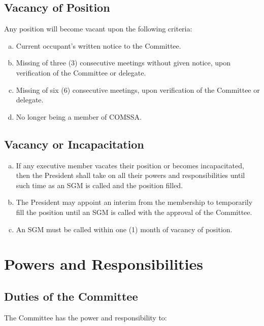 \documentclass[a4paper,12pt]{article}
\begin{document}
\subsection{Vacancy of Position}

Any position will become vacant upon the following criteria:

\begin{enumerate}[a)]
	\item Current occupant's written notice to the Committee.
	\item Missing of three (3) consecutive meetings without given notice, upon verification of the Committee or delegate.
	\item Missing of six (6) consecutive meetings, upon verification of the Committee or delegate.
	\item No longer being a member of COMSSA.
\end{enumerate}

\subsection{Vacancy or Incapacitation}

\begin{enumerate}[a)]
	\item If any executive member vacates their position or becomes incapacitated, then the President shall take on all their powers and responsibilities until such time as an SGM is called and the position filled.
	\item The President may appoint an interim from the membership to temporarily fill the position until an SGM is called with the approval of the Committee.
	\item An SGM must be called within one (1) month of vacancy of position.
\end{enumerate}

\section{Powers and Responsibilities}

\subsection{Duties of the Committee}

The Committee has the power and responsibility to:
\end{document}

